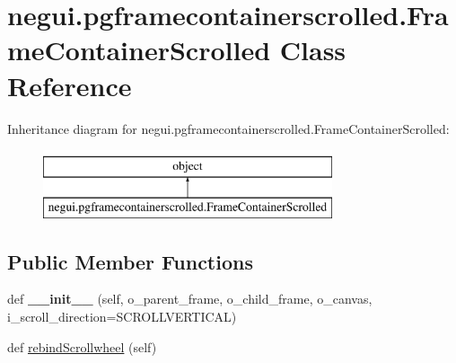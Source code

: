 \hypertarget{classnegui_1_1pgframecontainerscrolled_1_1FrameContainerScrolled}{}\section{negui.\+pgframecontainerscrolled.\+Frame\+Container\+Scrolled Class Reference}
\label{classnegui_1_1pgframecontainerscrolled_1_1FrameContainerScrolled}
Inheritance diagram for negui.\+pgframecontainerscrolled.\+Frame\+Container\+Scrolled\+:\begin{figure}[H]
\begin{center}
\leavevmode
\includegraphics[height=2.000000cm]{classnegui_1_1pgframecontainerscrolled_1_1FrameContainerScrolled}
\end{center}
\end{figure}
\subsection*{Public Member Functions}
\begin{DoxyCompactItemize}
\item 
def {\bfseries \+\_\+\+\_\+init\+\_\+\+\_\+} (self, o\+\_\+parent\+\_\+frame, o\+\_\+child\+\_\+frame, o\+\_\+canvas, i\+\_\+scroll\+\_\+direction=S\+C\+R\+O\+L\+L\+V\+E\+R\+T\+I\+C\+AL)\hypertarget{classnegui_1_1pgframecontainerscrolled_1_1FrameContainerScrolled_a9a522fc76132e89237920a9878e826d1}{}\label{classnegui_1_1pgframecontainerscrolled_1_1FrameContainerScrolled_a9a522fc76132e89237920a9878e826d1}

\item 
def \hyperlink{classnegui_1_1pgframecontainerscrolled_1_1FrameContainerScrolled_a4de903801fd0962b403d29b1653b07c2}{rebind\+Scrollwheel} (self)
\end{DoxyCompactItemize}
